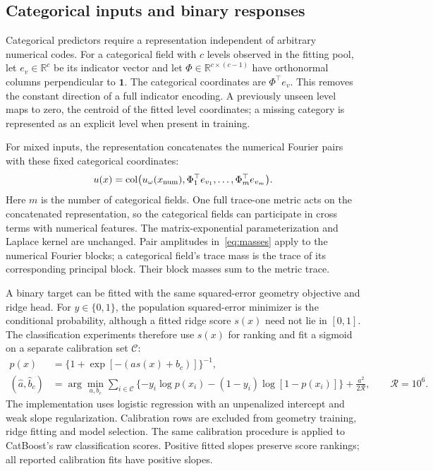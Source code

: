 \documentclass[11pt]{article}
\newcommand{\R}{\mathbb R}
\newcommand{\one}{\bm 1}
\begin{document}
\subsection{Categorical inputs and binary responses}\label{sec:mixed}
Categorical predictors require a representation independent of arbitrary numerical codes. For a categorical field with $c$ levels observed in the fitting pool, let $e_v\in\R^c$ be its indicator vector and let $\Phi\in\R^{c\times(c-1)}$ have orthonormal columns perpendicular to $\one$. The categorical coordinates are $\Phi^\top e_v$. This removes the constant direction of a full indicator encoding. A previously unseen level maps to zero, the centroid of the fitted level coordinates; a missing category is represented as an explicit level when present in training.

For mixed inputs, the representation concatenates the numerical Fourier pairs with these fixed categorical coordinates:
\begin{equation}
 u(x)=\operatorname{col}\bigl(u_\omega(x_{\rm num}),
                 \Phi_1^\top e_{v_1},\ldots,\Phi_m^\top e_{v_m}\bigr).
\end{equation}
Here $m$ is the number of categorical fields. One full trace-one metric acts on the concatenated representation, so the categorical fields can participate in cross terms with numerical features. The matrix-exponential parameterization and Laplace kernel are unchanged. Pair amplitudes in~\eqref{eq:masses} apply to the numerical Fourier blocks; a categorical field's trace mass is the trace of its corresponding principal block. Their block masses sum to the metric trace.

A binary target can be fitted with the same squared-error geometry objective and ridge head. For $y\in\{0,1\}$, the population squared-error minimizer is the conditional probability, although a fitted ridge score $s(x)$ need not lie in $[0,1]$. The classification experiments therefore use $s(x)$ for ranking and fit a sigmoid on a separate calibration set $\mathcal C$:
\begin{align}
 p(x)&=\{1+\exp[-(a s(x)+b_c)]\}^{-1},\\
 (\widehat a,\widehat b_c)
 &=\arg\min_{a,b_c}\sum_{i\in\mathcal C}
       \{-y_i\log p(x_i)-(1-y_i)\log[1-p(x_i)]\}
       +\frac{a^2}{2\mathcal R},\qquad \mathcal R=10^6.
\end{align}
The implementation uses logistic regression with an unpenalized intercept and weak slope regularization. Calibration rows are excluded from geometry training, ridge fitting and model selection. The same calibration procedure is applied to CatBoost's raw classification scores. Positive fitted slopes preserve score rankings; all reported calibration fits have positive slopes.
\end{document}
